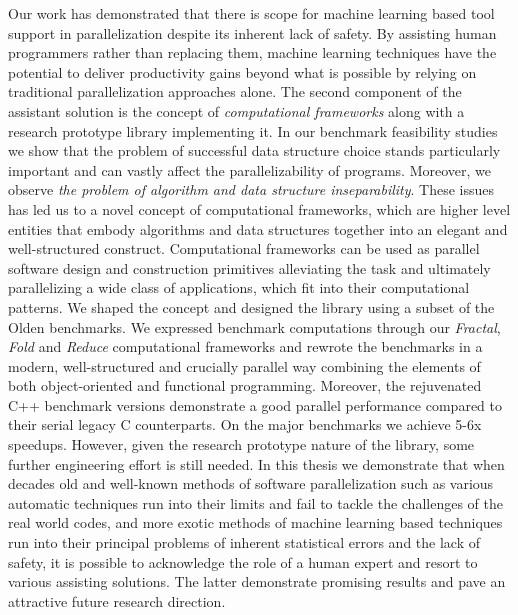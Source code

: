 \quad Our work has demonstrated that there is scope for machine learning based tool support in parallelization despite its inherent lack of safety. By assisting human programmers rather than replacing them, machine learning techniques have the potential to deliver productivity gains beyond what is possible by relying on traditional parallelization approaches alone.\newline\null
\quad The second component of the assistant solution is the concept of \textit{computational frameworks} along with a research prototype library implementing it. In our benchmark feasibility studies we show that the problem of successful data structure choice stands particularly important and can vastly affect the parallelizability of programs. Moreover, we observe \textit{the problem of algorithm and data structure inseparability}. These issues has led us to a novel concept of computational frameworks, which are higher level entities that embody algorithms and data structures together into an elegant and well-structured construct. Computational frameworks can be used as parallel software design and construction primitives alleviating the task and ultimately parallelizing a wide class of applications, which fit into their computational patterns.\newline\null
\quad We shaped the concept and designed the library using a subset of the Olden benchmarks. We expressed benchmark computations through our \textit{Fractal}, \textit{Fold} and \textit{Reduce} computational frameworks and rewrote the benchmarks in a modern, well-structured and crucially parallel way combining the elements of both object-oriented and functional programming. Moreover, the rejuvenated C++ benchmark versions demonstrate a good parallel performance compared to their serial legacy C counterparts. On the major benchmarks we achieve 5-6x speedups. However, given the research prototype nature of the library, some further engineering effort is still needed.\newline\null
\quad In this thesis we demonstrate that when decades old and well-known methods of software parallelization such as various automatic techniques run into their limits and fail to tackle the challenges of the real world codes, and more exotic methods of machine learning based techniques run into their principal problems of inherent statistical errors and the lack of safety, it is possible to acknowledge the role of a human expert and resort to various assisting solutions. The latter demonstrate promising results and pave an attractive future research direction.

%